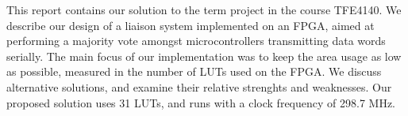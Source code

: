 \abstract
This report contains our solution to the term project in the course
TFE4140. We describe our design of a liaison system implemented on an
FPGA, aimed at performing a majority vote amongst microcontrollers
transmitting data words serially. The main focus of our implementation
was to keep the area usage as low as possible, measured in the number
of LUTs used on the FPGA. We discuss alternative solutions, and
examine their relative strenghts and weaknesses.  Our proposed
solution uses 31 LUTs, and runs with a clock frequency of 298.7 MHz.

